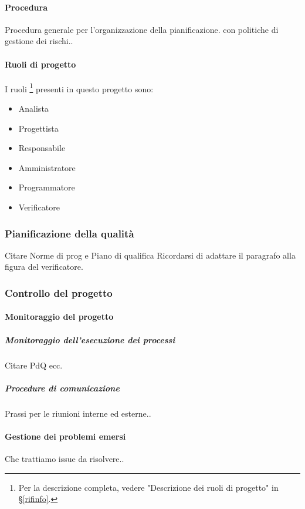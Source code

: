 			\paragraph{Procedura}	
			Procedura generale per l’organizzazione della pianificazione.
			con politiche di gestione dei rischi..
			
			\paragraph{Ruoli di progetto}
			I ruoli \footnote{Per la descrizione completa, vedere "Descrizione dei ruoli di progetto" in \S\ref{rifinfo}.} presenti in questo progetto sono:
			\begin{itemize}
				\item Analista
				\item Progettista
				\item Responsabile
				\item Amministratore
				\item Programmatore
				\item Verificatore
			\end{itemize}
			
			 
		
		\subsubsection{Pianificazione della qualità}
		Citare Norme di prog e Piano di qualifica
		Ricordarsi di adattare il paragrafo alla figura del verificatore.
		
		\subsubsection{Controllo del progetto}
		
			\paragraph{Monitoraggio del progetto}
			
			\subparagraph{Monitoraggio dell'esecuzione dei processi}
			Citare PdQ ecc.
			
			\subparagraph{Procedure di comunicazione}
    		Prassi per le riunioni interne ed esterne..
    		
    		
    		\paragraph{Gestione dei problemi emersi}
    		Che trattiamo issue da risolvere..
    		
